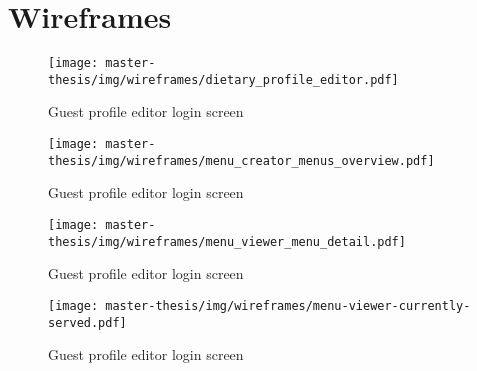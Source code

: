 \section{Wireframes}
\begin{figure}[h]
  \centering
  \texttt{[image: master-thesis/img/wireframes/dietary\_profile\_editor.pdf]}
  \caption{Guest profile editor login screen}
\end{figure}

\begin{figure}[h]
  \centering
  \texttt{[image: master-thesis/img/wireframes/menu\_creator\_menus\_overview.pdf]}
  \caption{Guest profile editor login screen}
\end{figure}

\begin{figure}[h]
  \centering
  \texttt{[image: master-thesis/img/wireframes/menu\_viewer\_menu\_detail.pdf]}
  \caption{Guest profile editor login screen}
\end{figure}

\begin{figure}[h]
  \centering
  \texttt{[image: master-thesis/img/wireframes/menu-viewer-currently-served.pdf]}
  \caption{Guest profile editor login screen}
\end{figure}
